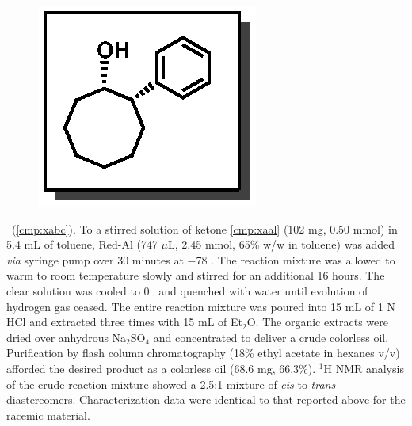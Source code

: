 \vspace{10pt}
\begin{figure}
  \vspace{-22pt}
  \begin{center}
    \includegraphics[scale=0.8]{chp_asymmetric/images/xaba}
  \end{center}
  \vspace{-25pt}
\end{figure}\noindent \textbf{\CMPxabc}\ (\ref{cmp:xabc}). To a stirred
solution of ketone \ref{cmp:xaal} (102 mg, 0.50 mmol) in 5.4 mL of toluene,
Red-Al (747 $\mu$L, 2.45 mmol, 65\% w/w in toluene) was added \textit{via}
syringe pump over 30 minutes at $-$78 \degc. The reaction mixture was allowed to
warm to room temperature slowly and stirred for an additional 16 hours. The
clear solution was cooled to 0 \degc\ and quenched with water until evolution of
hydrogen gas ceased. The entire reaction mixture was poured into 15 mL of 1 N
HCl and extracted three times with 15 mL of Et$_2$O. The organic extracts were
dried over anhydrous Na$_2$SO$_4$ and concentrated to deliver a crude colorless
oil. Purification by flash column chromatography (18\% ethyl acetate in hexanes
v/v) afforded the desired product as a colorless oil (68.6 mg, 66.3\%). $^1$H
NMR analysis of the crude reaction mixture showed a 2.5:1 mixture of \textit{cis} to
\textit{trans} diastereomers. Characterization data were identical to that
reported above for the racemic material.

